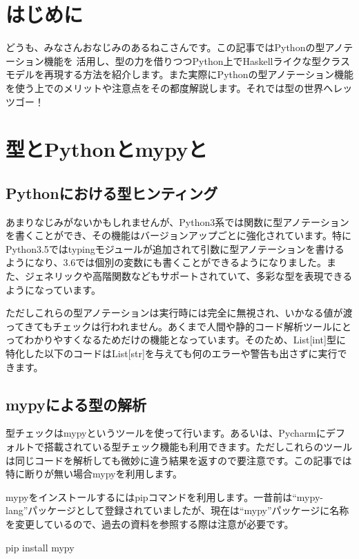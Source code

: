 \section{はじめに}
どうも、みなさんおなじみのあるねこさんです。この記事ではPythonの型アノテーション機能を
活用し、型の力を借りつつPython上でHaskellライクな型クラスモデルを再現する方法を紹介します。また実際にPythonの型アノテーション機能を使う上でのメリットや注意点をその都度解説します。それでは型の世界へレッツゴー！

\section{型とPythonとmypyと}
\subsection{Pythonにおける型ヒンティング}
あまりなじみがないかもしれませんが、Python3系では関数に型アノテーションを書くことができ、その機能はバージョンアップごとに強化されています。特にPython3.5ではtypingモジュールが追加されて引数に型アノテーションを書けるようになり、3.6では個別の変数にも書くことができるようになりました。また、ジェネリックや高階関数などもサポートされていて、多彩な型を表現できるようになっています。

ただしこれらの型アノテーションは実行時には完全に無視され、いかなる値が渡ってきてもチェックは行われません。あくまで人間や静的コード解析ツールにとってわかりやすくなるためだけの機能となっています。そのため、List[int]型に特化した以下のコードはList[str]を与えても何のエラーや警告も出さずに実行できます。


\subsection{mypyによる型の解析}
型チェックはmypyというツールを使って行います。あるいは、Pycharmにデフォルトで搭載されている型チェック機能も利用できます。ただしこれらのツールは同じコードを解析しても微妙に違う結果を返すので要注意です。この記事では特に断りが無い場合mypyを利用します。

mypyをインストールするにはpipコマンドを利用します。一昔前は``mypy-lang''パッケージとして登録されていましたが、現在は``mypy''パッケージに名称を変更しているので、過去の資料を参照する際は注意が必要です。

\begin{bashcode}
pip install mypy
\end{bashcode}

